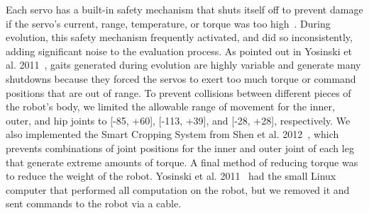Each servo has a built-in safety mechanism that shuts itself off to prevent damage if the servo's current, range, temperature, or torque was too high~\cite{robotis}. During evolution, this safety mechanism frequently activated, and did so inconsistently, adding significant noise to the evaluation process. As pointed out in Yosinski et al. 2011~\cite{yos:clune},  gaits generated during evolution are highly variable and generate many shutdowns because they forced the servos to exert too much torque or command positions that are out of range. %
To prevent collisions between different pieces of the robot's body, we limited the allowable range of movement for the inner, outer, and hip joints to [-85\degree, +60\degree], [-113\degree, +39\degree], and [-28\degree, +28\degree], respectively. We also implemented the Smart Cropping System from Shen et al. 2012~\cite{haocheng}, which prevents combinations of joint positions for the inner and outer joint of each leg that generate extreme amounts of torque. A final method of reducing torque was to reduce the weight of the robot. Yosinski et al. 2011~\cite{yos:clune} had the small Linux computer that performed all computation on the robot, but we removed it and sent commands to the robot via a cable. 
